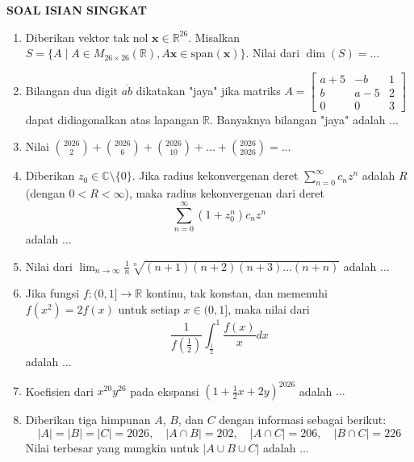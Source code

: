 \documentclass{article}
\begin{document}
\begin{center}
  \textbf{SOAL ISIAN SINGKAT}
\end{center}

\begin{enumerate}
  \item Diberikan vektor tak nol $\mathbf{x} \in \mathbb{R}^{26}$. Misalkan $S = \{A \mid A \in M_{26 \times 26}(\mathbb{R}), A\mathbf{x} \in \text{span}(\mathbf{x})\}$. Nilai dari $\dim(S) = \dots$

  \item Bilangan dua digit $\overline{ab}$ dikatakan "jaya" jika matriks $A = \begin{bmatrix} a+5 & -b & 1 \\ b & a-5 & 2 \\ 0 & 0 & 3 \end{bmatrix}$ dapat didiagonalkan atas lapangan $\mathbb{R}$. Banyaknya bilangan "jaya" adalah $\dots$

  \item Nilai $\displaystyle \binom{2026}{2} + \binom{2026}{6} + \binom{2026}{10} + \dots + \binom{2026}{2026} = \dots$

  \item Diberikan $z_0 \in \mathbb{C} \setminus \{0\}$. Jika radius kekonvergenan deret $\displaystyle \sum_{n=0}^{\infty} c_n z^n$ adalah $R$ (dengan $0 < R < \infty$), maka radius kekonvergenan dari deret
        \[
          \sum_{n=0}^{\infty} (1 + z_0^n) c_n z^n
        \]
        adalah $\dots$

  \item Nilai dari $\displaystyle \lim_{n \to \infty} \frac{1}{n} \sqrt[n]{(n+1)(n+2)(n+3)\dots(n+n)}$ adalah $\dots$

  \item Jika fungsi $f : (0, 1] \to \mathbb{R}$ kontinu, tak konstan, dan memenuhi $f(x^2) = 2f(x)$ untuk setiap $x \in (0, 1]$, maka nilai dari
        \[
          \frac{1}{f\left(\frac{1}{2}\right)} \int_{\frac{1}{2}}^{1} \frac{f(x)}{x} dx
        \]
        adalah $\dots$

  \item Koefisien dari $x^{20}y^{26}$ pada ekspansi $\displaystyle \left(1 + \frac{1}{2}x + 2y\right)^{2026}$ adalah $\dots$

  \item Diberikan tiga himpunan $A$, $B$, dan $C$ dengan informasi sebagai berikut:
        \[
          |A| = |B| = |C| = 2026, \quad |A \cap B| = 202, \quad |A \cap C| = 206, \quad |B \cap C| = 226
        \]
        Nilai terbesar yang mungkin untuk $|A \cup B \cup C|$ adalah $\dots$


\end{enumerate}
\end{document}
